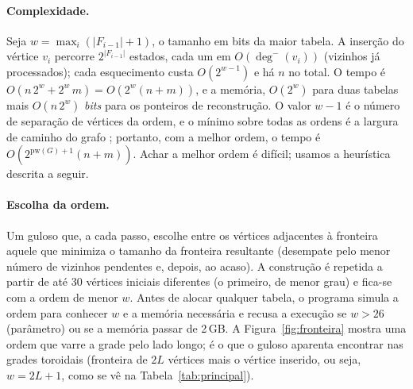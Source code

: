\paragraph{Complexidade.} Seja $w=\max_i(|F_{i-1}|+1)$, o tamanho em bits da maior tabela. A inserção do vértice $v_i$ percorre $2^{|F_{i-1}|}$ estados, cada um em $O(\deg^-(v_i))$ (vizinhos já processados); cada esquecimento custa $O(2^{w-1})$ e há $n$ no total. O tempo é $O(n\,2^{w}+2^{w}\,m)=O(2^{w}(n+m))$, e a memória, $O(2^{w})$ para duas tabelas mais $O(n\,2^{w})$ \emph{bits} para os ponteiros de reconstrução. O valor $w-1$ é o número de separação de vértices da ordem, e o mínimo sobre todas as ordens é a largura de caminho do grafo \cite{Kinnersley 1992}; portanto, com a melhor ordem, o tempo é $O(2^{\mathrm{pw}(G)+1}(n+m))$. Achar a melhor ordem é difícil; usamos a heurística descrita a seguir.

\paragraph{Escolha da ordem.} Um guloso que, a cada passo, escolhe entre os vértices adjacentes à fronteira aquele que minimiza o tamanho da fronteira resultante (desempate pelo menor número de vizinhos pendentes e, depois, ao acaso). A construção é repetida a partir de até 30 vértices iniciais diferentes (o primeiro, de menor grau) e fica-se com a ordem de menor $w$. Antes de alocar qualquer tabela, o programa simula a ordem para conhecer $w$ e a memória necessária e recusa a execução se $w>26$ (parâmetro) ou se a memória passar de 2\,GB. A Figura~\ref{fig:fronteira} mostra uma ordem que varre a grade pelo lado longo; é o que o guloso aparenta encontrar nas grades toroidais (fronteira de $2L$ vértices mais o vértice inserido, ou seja, $w=2L+1$, como se vê na Tabela~\ref{tab:principal}).


